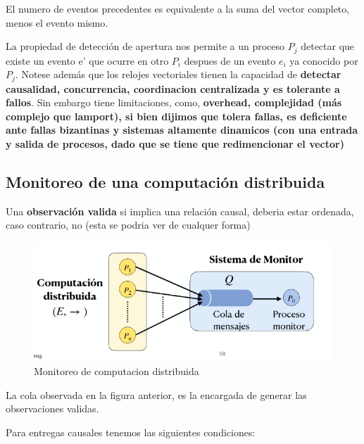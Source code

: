 El  numero de eventos precedentes es equivalente a la suma del vector completo, menos el evento mismo.

La propiedad de detección de apertura nos permite a un proceso $P_j$ detectar que existe un evento e' que ocurre en otro $P_i$ despues de un evento $e_i$ ya conocido por $P_j$. Notese además que los relojes vectoriales tienen la capacidad de \textbf{detectar causalidad, concurrencia, coordinacion centralizada y es tolerante a fallos}. Sin embargo tiene limitaciones, como, \textbf{overhead, complejidad (más complejo que lamport), si bien dijimos que tolera fallas, es deficiente ante fallas bizantinas y sistemas altamente dinamicos (con una entrada y salida de procesos, dado que se tiene que redimencionar el vector)}

\subsection{Monitoreo de una computación distribuida}

Una \textbf{observación valida} si implica una relación causal, deberia estar ordenada, caso contrario, no (esta se podria ver de cualquer forma) 

  \begin{figure}[H]
    \centering
    \includegraphics[width=0.5\linewidth]{img/Monitoreo_computacion_distribuida.png}
    \caption{Monitoreo de computacion distribuida}\label{fig:1760794290290}
  \end{figure}

La cola observada en la figura anterior, es la encargada de generar las observaciones validas.

Para entregas causales tenemos las siguientes condiciones:

